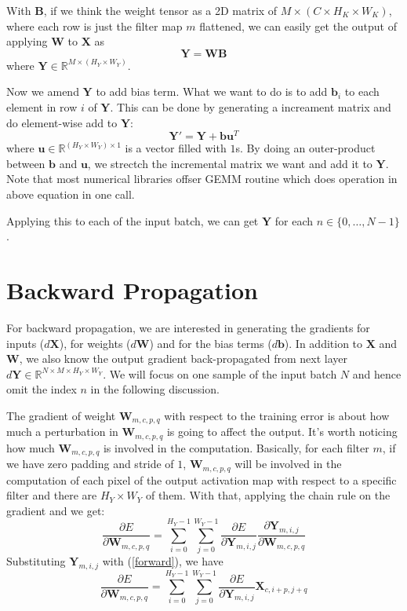 \documentclass[authordraft=true,dvipsnames]{acmart}
\newcommand{\pref}[1]{(\ref{#1})}
\newcommand{\bx}[0]{\mathbf{X}}
\newcommand{\bw}[0]{\mathbf{W}}
\newcommand{\by}[0]{\mathbf{Y}}
\newcommand{\bb}[0]{\mathbf{B}}
\begin{document}
With $\bb$, if we think the weight tensor as a 2D matrix of $M \times (C \times H_K \times W_K)$, where each row is just the filter map $m$ flattened, we can easily get the output of applying $\bw$ to $\bx$ as 
\begin{equation} \label{bm}
\by = \bw \bb
\end{equation}
where $\by \in \mathbb{R}^{M \times (H_Y \times W_Y)}$. 

Now we amend $\by$ to add bias term. What we want to do is to add $\mathbf{b}_i$ to each element in row $i$ of $\mathbf{Y}$. This can be done by generating a increament matrix and do element-wise add to  $\mathbf{Y}$:
\begin{equation} \label{bias}
 \mathbf{Y'} =  \by + \mathbf{b} \mathbf{u}^T
\end{equation}
where $\mathbf{u} \in \mathbb{R}^{(H_Y \times W_Y) \times 1}$ is a vector filled with $1$s. By doing an outer-product between $\mathbf{b}$ and $\mathbf{u}$, we strectch the incremental matrix we want and add it to $ \by$. Note that most numerical libraries offser GEMM routine which does operation in above equation in one call. 

Applying this to each of the input batch, we can get $\by$ for each $n \in \{0,\ldots,N-1\}$. 
 
\section{Backward Propagation}
For backward propagation, we are interested in generating the gradients for inputs ($d\bx$), for weights ($d\bw$) and for the bias terms ($d\mathbf{b}$). In addition to $\mathbf{X}$ and $\mathbf{W}$, we also know the output gradient back-propagated from next layer $d\by \in \mathbb{R}^{N \times M \times H_Y \times W_Y}$. We will focus on one sample of the input batch $N$ and hence omit the index $n$ in the following discussion.  

The gradient of weight $\bw_{m,c,p,q}$ with respect to the training error is about how much a perturbation in $\mathbf{W}_{m,c,p,q}$ is going to affect the output. It's worth noticing how much $\mathbf{W}_{m,c,p,q}$ is involved in the computation. Basically, for each filter $m$, if we have zero padding and stride of $1$, $\mathbf{W}_{m,c,p,q}$ will be involved in the computation of each pixel of the output activation map with respect to a specific filter and there are $H_Y \times W_Y$ of them. With that,  
applying the chain rule on the gradient and we get:
\begin{equation}
\frac{\partial E}{\partial \bw_{m,c,p,q}} = \sum_{i=0}^{H_Y-1}{\sum_{j=0}^{W_Y-1}{\frac{\partial E}{\partial \by_{m,i,j}}\frac{\partial \mathbf{Y}_{m,i,j}}{\partial  \mathbf{W}_{m,c,p,q}}}}
\end{equation}
Substituting $\by_{m,i,j}$ with \pref{forward}, we have
\begin{equation} \label{dw}
\frac{\partial E}{\partial \bw_{m,c,p,q}} = \sum_{i=0}^{H_Y-1}{\sum_{j=0}^{W_Y-1}{\frac{\partial E}{\partial \by_{m,i,j}}\bx_{c,i+p,j+q}}}
\end{equation}
 
\end{document}

